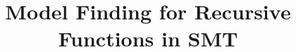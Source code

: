 \newcommand\ty[1]{\con{#1}}
\newcommand{\Bool}{\ty{Bool}}
\newcommand{\ltrue}{\top}
\newcommand{\lfalse}{\bot}
\newcommand{\lite}{\con{ite}}

\newcommand\concret{\gamma} %

\newcommand{\boolop}{\con{b}}
\newcommand{\forallf}[1]{\forall_{\!#1\:}}
\newcommand{\fnull}{\emptyset}
\newcommand{\vecfarg}[1]{\vec{\concret}_{#1}}
\newcommand{\farg}[1]{\concret_{#1}}
\newcommand{\fargx}[2]{\concret_{#1,#2}}
\newcommand{\fargtype}[1]{\alpha_{#1}}

\newcommand{\Sigmalia}{\Sigma_{\mathcalx{LIA}}}
\newcommand{\extendsig}[1]{\mathcalx{E}( #1 )}

\newcommand{\rem}[1]{\textcolor{red}{[#1]}}
\newcommand{\ajr}[1]{\rem{#1 --ajr}}
\newcommand{\jb}[1]{\rem{#1 --jb}}
\newcommand{\ct}[1]{\rem{#1 --ct}}

\newcommand{\negvthinspace}{\kern-0.083333em}
\newcommand{\vthinspace}{\kern+0.083333em}
\newcommand{\vvthinspace}{\kern+0.0416666em}
\newcommand{\typ}[1]{^{\vthinspace #1}}

\newcommand{\definefunreccmd}{\con{define}\text{-}\con{fun}\text{-}\con{rec}}
\newcommand{\definefunsreccmd}{\con{define}\text{-}\con{funs}\text{-}\con{rec}}

\newcommand{\Mo}{{\mathcal{I}}}

\newcommand{\euf}{\ensuremath{\mathcalx{UF}}\xspace}
\newcommand{\ari}{\ensuremath{\mathcalx{A}}\xspace}

\newcommand{\absconstraints}{\mathrm{X}}

%
%
\usepackage{program}

\def\squareforqed{\hbox{\rlap{$\sqcap$}$\sqcup$}}

\newcommand\xend{{\hfill$\scriptstyle\blacksquare$}}
\renewcommand\qed{{\hfill$\squareforqed$}}


\let\labelitemi=\labelitemii %
\makeatletter
\ps@myheadings
\makeatother



\title{Model Finding for Recursive Functions in SMT}

